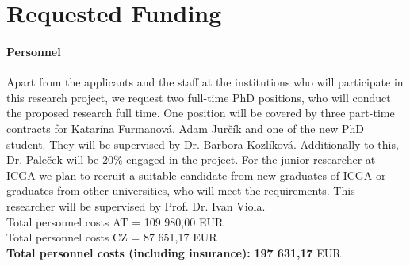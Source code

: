 \documentclass[11pt,a4paper,titlepage,oneside,onecolumn]{article}
\begin{document}

\section{Requested Funding}
\label{sec:RequestedFunding}

\paragraph{Personnel}
Apart from the applicants and the staff at the institutions who will participate in this research project, we request two full-time PhD positions, who will conduct the proposed research full time. 
One position will be covered by three part-time contracts for Katar\'{i}na Furmanov\'{a}, Adam Jur\v{c}\'{i}k and one of the new PhD student. 
They will be supervised by Dr. Barbora Kozl\'{i}kov\'{a}.
Additionally to this, Dr. Pale\v{c}ek will be 20\% engaged in the project.
For the junior researcher at ICGA we plan to recruit a suitable candidate from new graduates of ICGA or graduates from other universities, who will meet the requirements.
This researcher will be supervised by Prof. Dr. Ivan Viola.\\
Total personnel costs AT = 109 980,00 EUR\\
Total personnel costs CZ = 87 651,17 EUR\\
\textbf{Total personnel costs (including insurance):}   \textbf{197 631,17} EUR
\end{document}
